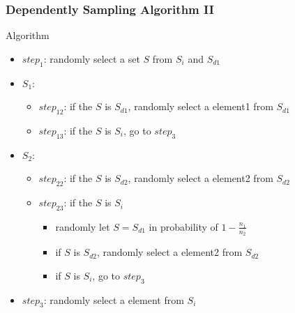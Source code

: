 \documentclass[notheorems, aspectratio=54]{beamer}
\begin{document}
\begin{frame}
    \frametitle{Dependently Sampling Algorithm II}
    \begin{block}{Algorithm}
        \begin{itemize}
            \item $step_{1}$: randomly select a set $S$ from $S_i$ and $S_{d1}$
            \item $S_1$:
            \begin{itemize}
                \item $step_{12}$: if the $S$ is $S_{d1}$, randomly select a element1 from $S_{d1}$
                \item $step_{13}$: if the $S$ is $S_i$, go to $step_{3}$
            \end{itemize}
            \item $S_2$:
            \begin{itemize}
                \item $step_{22}$: if the $S$ is $S_{d2}$, randomly select a element2 from $S_{d2}$
                \item $step_{23}$: if the $S$ is $S_i$
                \begin{itemize}
                    \item randomly let $S = S_{d1}$ in probability of $1-\frac{n_1}{n_2}$
                    \item if $S$ is $S_{d2}$, randomly select a element2 from $S_{d2}$
                    \item if $S$ is $S_i$, go to $step_{3}$
                \end{itemize}
            \end{itemize}
            \item $step_{3}$: randomly select a element from $S_i$
        \end{itemize}
    \end{block}
\end{frame}
\end{document}
